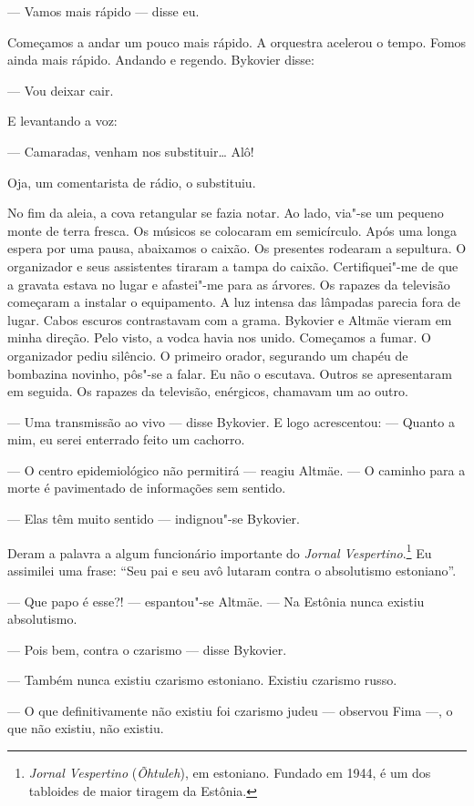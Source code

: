 --- Vamos mais rápido --- disse eu.

Começamos a andar um pouco mais rápido. A orquestra acelerou o tempo.
Fomos ainda mais rápido. Andando e regendo. Bykovier disse:

--- Vou deixar cair.

E levantando a voz:

--- Camaradas, venham nos substituir\ldots{} Alô!

Oja, um comentarista de rádio, o substituiu.

No fim da aleia, a cova retangular se fazia notar. Ao lado, via"-se um
pequeno monte de terra fresca. Os músicos se colocaram em semicírculo.
Após uma longa espera por uma pausa, abaixamos o caixão. Os presentes
rodearam a sepultura. O organizador e seus assistentes tiraram a tampa
do caixão. Certifiquei"-me de que a gravata estava no lugar e afastei"-me
para as árvores. Os rapazes da televisão começaram a instalar o
equipamento. A luz intensa das lâmpadas parecia fora de lugar. Cabos
escuros contrastavam com a grama. Bykovier e Altmäe vieram em minha
direção. Pelo visto, a vodca havia nos unido. Começamos a fumar. O
organizador pediu silêncio. O primeiro orador, segurando um chapéu de
bombazina novinho, pôs"-se a falar. Eu não o escutava. Outros se
apresentaram em seguida. Os rapazes da televisão, enérgicos, chamavam um
ao outro.

--- Uma transmissão ao vivo --- disse Bykovier. E logo acrescentou: ---
Quanto a mim, eu serei enterrado feito um cachorro.

--- O centro epidemiológico não permitirá --- reagiu Altmäe. --- O
caminho para a morte é pavimentado de informações sem sentido.

--- Elas têm muito sentido --- indignou"-se Bykovier.

Deram a palavra a algum funcionário importante do \emph{Jornal
Vespertino}.\footnote{\emph{Jornal Vespertino} (\emph{Õhtuleh}),
  em estoniano. Fundado em 1944, é um dos tabloides de maior tiragem da
  Estônia.} Eu assimilei uma frase: ``Seu pai e seu avô lutaram contra o
absolutismo estoniano''.

--- Que papo é esse?! --- espantou"-se Altmäe. --- Na Estônia nunca
existiu absolutismo.

--- Pois bem, contra o czarismo --- disse Bykovier.

--- Também nunca existiu czarismo estoniano. Existiu czarismo russo.

--- O que definitivamente não existiu foi czarismo judeu --- observou
Fima ---, o que não existiu, não existiu.

